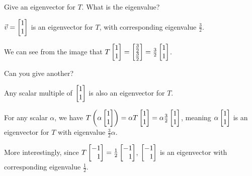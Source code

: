 	\begin{parts}
		\item Give an eigenvector for $T$. What is the eigenvalue?
			\begin{solution}
				$\vec v=\mat{1\\1}$ is an eigenvector for $T$, with corresponding
				eigenvalue $\frac{3}{2}$.

				We can see from the image that
				$T\mat{1\\1}=\mat{\frac{3}{2}\\\frac{3}{2}}=\frac{3}{2}\mat{1\\1}$.
			\end{solution}
		\item Can you give another?
			\begin{solution}
				Any scalar multiple of $\mat{1\\1}$ is also an eigenvector for $T$.

				For any scalar $\alpha$, we have
				$T\left(\alpha\mat{1\\1}\right)=\alpha T\mat{1\\1}=\alpha\frac{3}{2}\mat{1\\1}$,
				meaning $\alpha\mat{1\\1}$ is an eigenvector for $T$ with
				eigenvalue $\frac{3}{2}\alpha$.

				More interestingly, since $T\mat{-1\\1}=\frac{1}{2}\mat{-1\\1}$,
				$\mat{-1\\1}$ is an eigenvector with corresponding eigenvalue
				$\frac{1}{2}$.
			\end{solution}
	\end{parts}


